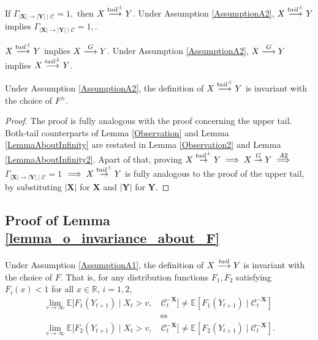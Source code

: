 \documentclass[a4paper,11pt]{article}
\newenvironment{customlem}[1]
  {\renewcommand\theinnercustomlem{#1}\innercustomlem}
  {\endinnercustomlem}
\newenvironment{customprop}[1]
  {\renewcommand\theinnercustomprop{#1}\innercustomprop}
  {\endinnercustomprop}
\newcommand{\toverset}[2]{\overset{{\rm #1}}{#2}}
\begin{document}
\begin{customprop}{\ref{Proposition_both_tails}}
    \item If 
$
\Gamma_{|\textbf{X}|\to|\textbf{Y}|\mid\mathcal{C}} = 1,
$
then $\textbf{X}\toverset{tail^{\pm}}{\longrightarrow}\textbf{Y}$. Under Assumption \ref{AssumptionA2},  $\textbf{X}\toverset{tail^{\pm}}{\longrightarrow}\textbf{Y}$ implies $
\Gamma_{|\textbf{X}|\to|\textbf{Y}|\mid\mathcal{C}} = 1,
$.
    \item  $\textbf{X}\toverset{tail^{\pm}}{\longrightarrow}\textbf{Y}$ implies $\textbf{X}\toverset{G}{\longrightarrow}\textbf{Y}$. Under Assumption \ref{AssumptionA2},  $\textbf{X}\toverset{G}{\longrightarrow}\textbf{Y}$ implies $\textbf{X}\toverset{tail^{\pm}}{\longrightarrow}\textbf{Y}$. 
    \item  Under Assumption \ref{AssumptionA2}, the definition of  $\textbf{X}\toverset{tail^{\pm}}{\longrightarrow}\textbf{Y}$ is invariant with the choice of $F^{\pm}$. 
\end{customprop}
\begin{proof}\label{proof_of_proposition_both_tails}
The proof is fully analogous with the proof concerning the upper tail. Both-tail counterparts of Lemma \ref{Observation} and Lemma \ref{LemmaAboutInfinity} are restated in Lemma \ref{Observation2} and Lemma \ref{LemmaAboutInfinity2}. Apart of that, proving  $X\toverset{tail^{\pm}}{\to}Y\implies X\toverset{G}{\to}Y \overset{A2}{\implies}$ $\Gamma_{|\textbf{X}|\to|\textbf{Y}|\mid\mathcal{C}} = 1$ $\implies X\toverset{tail^{\pm}}{\to}Y$ is fully analogous to the proof of the upper tail, by substituting $|\textbf{X}|$ for $\textbf{X}$ and $|\textbf{Y}|$ for $\textbf{Y}$.  
\end{proof}




\subsection{Proof of Lemma \ref{lemma_o_invariance_about_F}  }



\begin{customlem}{\ref{lemma_o_invariance_about_F}}
Under Assumption \ref{AssumptionA1}, the definition of  $\textbf{X}\toverset{tail}{\longrightarrow}\textbf{Y}$ is invariant with the choice of $F$. That is, for any distribution functions $F_1, F_2$ satisfying $F_i(x)<1$ for all $x\in\mathbb{R}$, $i=1,2$, 
\begin{equation*}
    \begin{split}
        \lim_{v\to\infty} \mathbb{E}[ F_1(Y_{t+1})\mid X_t>v,&  \, \mathcal{C}^{-\textbf{X}}_t]\neq\mathbb{E}[ F_1(Y_{t+1})\mid  \mathcal{C}^{-\textbf{X}}_t]\\
        & \iff \\
        \lim_{v\to\infty} \mathbb{E}[ F_2(Y_{t+1})\mid X_t>v,&\,  \mathcal{C}^{-\textbf{X}}_t]\neq\mathbb{E}[ F_2(Y_{t+1})\mid  \mathcal{C}^{-\textbf{X}}_t]. 
    \end{split}
\end{equation*}
\end{customlem}
\end{document}
